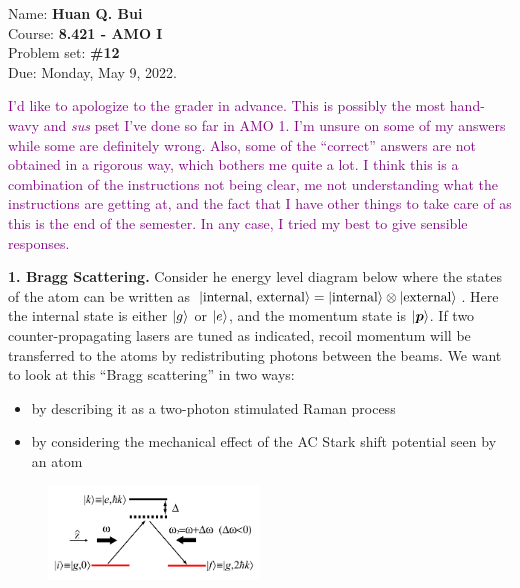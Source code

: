 \documentclass{article}
\theoremstyle{definition}
\begin{document}
\begin{framed}
\noindent Name: \textbf{Huan Q. Bui}\\
Course: \textbf{8.421 - AMO I}\\
Problem set: \textbf{\#12}\\
Due: Monday, May 9, 2022.
\end{framed}


\begin{framed}
	\noindent \textcolor{purple}{I'd like to apologize to the grader in advance. This is possibly the most hand-wavy and \textit{sus} pset I've done so far in AMO 1. I'm unsure on some of my answers while some are definitely wrong. Also, some of the ``correct'' answers are not obtained in a rigorous way, which bothers me quite a lot.  I think this is a combination of the instructions not being clear, me not understanding what the instructions are getting at, and the fact that I have other things to take care of as this is the end of the semester. In any case, I tried my best to give sensible responses.}
\end{framed}

\noindent \textbf{1. Bragg Scattering.} Consider he energy level diagram below where the states of the atom can be written as $\ket{\text{internal, external}} = \ket{\text{internal}}\otimes \ket{\text{external}}$. Here the internal state is either $\ket{g}$ or $\ket{e}$, and the momentum state is $\ket{\bm{p}}$. If two counter-propagating lasers are tuned as indicated, recoil momentum will be transferred to the atoms by redistributing photons between the beams. We want to look at this ``Bragg scattering'' in two ways:

\begin{itemize}
	\item by describing it as a two-photon stimulated Raman process
	\item by considering the mechanical effect of the AC Stark shift potential seen by an atom
\end{itemize}

\begin{figure}[!htb]
	\centering
	\includegraphics[width=0.5\textwidth]{bragg}
\end{figure}
\end{document}
